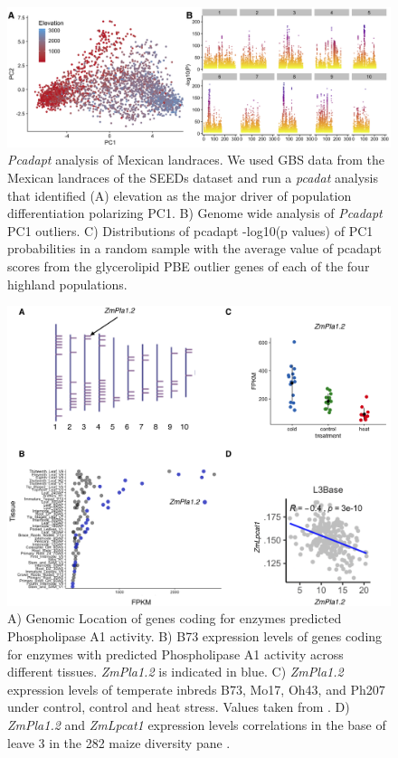 \documentclass[9pt,twocolumn,twoside,lineno]{gsajnl}
\begin{document}
\begin{figure}[t]
\begin{center}
\includegraphics[width=0.8\paperwidth]{Sup_Figures/Sup_Fig_2.png}
\caption{\textit{Pcadapt} analysis of Mexican landraces. We used GBS data from the Mexican landraces of the SEEDs dataset \citep{Romero_Navarro2017-cn} and run a \textit{pcadat} analysis \citep{Luu2017-ws} that identified (A) elevation as the major driver of population differentiation polarizing PC1.  
B) Genome wide analysis of \textit{Pcadapt} PC1 outliers. 
C) Distributions of pcadapt -log10(p values) of PC1 probabilities in a random sample with the average value of pcadapt scores from the glycerolipid PBE outlier genes of each of the four highland populations. 
}
\label{SupFig2}
\end{center}
\end{figure} 

\begin{figure}[t]
\begin{center}
\includegraphics[width=0.8\paperwidth]{Sup_Figures/Sup_Fig_3.png}
\caption{A) Genomic Location of genes coding for enzymes predicted Phospholipase A1 activity. B) B73 expression levels of genes coding for enzymes with predicted Phospholipase A1 activity across different tissues. \textit{ZmPla1.2} is indicated in blue. C) \textit{ZmPla1.2} expression levels of temperate inbreds B73, Mo17, Oh43, and Ph207 under control, control and heat stress. Values taken from \cite{Waters2017-nat}. D) \textit{ZmPla1.2} and \textit{ZmLpcat1} expression levels correlations in the base of leave 3 in the 282 maize diversity pane \cite{Kremling2018-gn}. 
}
\label{SupFig3}
\end{center}
\end{figure}  
\end{document}
